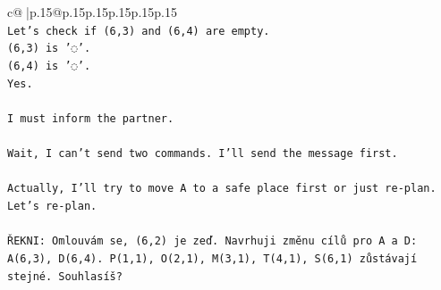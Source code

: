 \documentclass{article}
\begin{document}
{\begin{supertabular}{c@{$\;$}|p{.15\linewidth}@{}p{.15\linewidth}p{.15\linewidth}p{.15\linewidth}p{.15\linewidth}p{.15\linewidth}}
{{{\\ 
\texttt{Let's check if (6,3) and (6,4) are empty.} \\
\texttt{(6,3) is '◌'.} \\
\texttt{(6,4) is '◌'.} \\
\texttt{Yes.} \\
\\ 
\texttt{I must inform the partner.} \\
\\ 
\texttt{Wait, I can't send two commands. I'll send the message first.} \\
\\ 
\texttt{Actually, I'll try to move A to a safe place first or just re{-}plan.} \\
\texttt{Let's re{-}plan.} \\
\\ 
\texttt{ŘEKNI: Omlouvám se, (6,2) je zeď. Navrhuji změnu cílů pro A a D: A(6,3), D(6,4). P(1,1), O(2,1), M(3,1), T(4,1), S(6,1) zůstávají stejné. Souhlasíš?} \\
            }
        }
    }
     \\ \\


\end{supertabular}}
\end{document}
